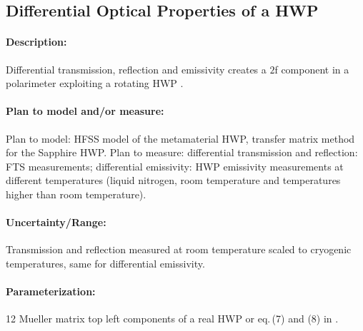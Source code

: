 \subsection{Differential Optical Properties of a HWP}

\paragraph{Description:}
Differential transmission, reflection and emissivity creates a $2$f component in a polarimeter exploiting a rotating HWP
\cite{Salatino10}. 

\paragraph{Plan to model and/or measure:}
Plan to model: HFSS model of the metamaterial HWP, transfer matrix method for the Sapphire HWP.
Plan to measure:
differential transmission and reflection: FTS measurements;
differential emissivity: HWP emissivity measurements at different temperatures
(liquid nitrogen, room temperature and temperatures higher than room temperature).

\paragraph{Uncertainty/Range:}
Transmission and reflection measured at room temperature scaled to cryogenic temperatures, same for differential emissivity.

\paragraph{Parameterization:}
12 Mueller matrix top left components of a real HWP or eq.$\,$(7) and (8) in \cite{Salatino16}. 
